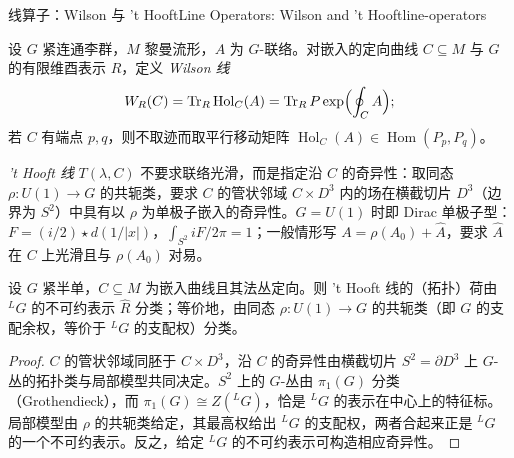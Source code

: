 \begin{centry}{线算子：Wilson 与 't Hooft}{Line Operators: Wilson and 't Hooft}{line-operators}

\begin{definition}
设 $G$ 紧连通李群，$M$ 黎曼流形，$A$ 为 $G$-联络。对嵌入的定向曲线 $C\subseteq M$ 与 $G$ 的有限维酉表示 $R$，定义 \emph{Wilson 线}
\[
W_R(C)=\operatorname{Tr}_R\operatorname{Hol}_C(A)=\operatorname{Tr}_R P\exp\Bigl(\oint_C A\Bigr);
\]
若 $C$ 有端点 $p,q$，则不取迹而取平行移动矩阵 $\operatorname{Hol}_C(A)\in\operatorname{Hom}(P_p,P_q)$。

\emph{'t Hooft 线} $T(\lambda,C)$ 不要求联络光滑，而是指定沿 $C$ 的奇异性：取同态 $\rho:U(1)\to G$ 的共轭类，要求 $C$ 的管状邻域 $C\times D^3$ 内的场在横截切片 $D^3$（边界为 $S^2$）中具有以 $\rho$ 为单极子嵌入的奇异性。$G=U(1)$ 时即 Dirac 单极子型：$F=(i/2)\star d(1/|x|)$，$\int_{S^2}iF/2\pi=1$；一般情形写 $A=\rho(A_0)+\hat A$，要求 $\hat A$ 在 $C$ 上光滑且与 $\rho(A_0)$ 对易。
\end{definition}

\begin{proposition}[GNO 分类]
设 $G$ 紧半单，$C\subseteq M$ 为嵌入曲线且其法丛定向。则 't Hooft 线的（拓扑）荷由 ${}^L G$ 的不可约表示 $\hat R$ 分类；等价地，由同态 $\rho:U(1)\to G$ 的共轭类（即 $G$ 的支配余权，等价于 ${}^L G$ 的支配权）分类。
\end{proposition}
\begin{proof}
$C$ 的管状邻域同胚于 $C\times D^3$，沿 $C$ 的奇异性由横截切片 $S^2=\partial D^3$ 上 $G$-丛的拓扑类与局部模型共同决定。$S^2$ 上的 $G$-丛由 $\pi_1(G)$ 分类（Grothendieck），而 $\pi_1(G)\cong Z({}^L G)$，恰是 ${}^L G$ 的表示在中心上的特征标。局部模型由 $\rho$ 的共轭类给定，其最高权给出 ${}^L G$ 的支配权，两者合起来正是 ${}^L G$ 的一个不可约表示。反之，给定 ${}^L G$ 的不可约表示可构造相应奇异性。
\end{proof}


\end{centry}
